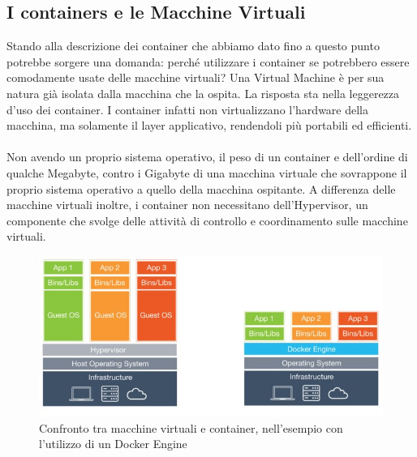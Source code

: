 \subsection{I containers e le Macchine Virtuali}
Stando alla descrizione dei container che abbiamo dato fino a questo punto potrebbe sorgere una domanda: perché utilizzare i container se potrebbero essere comodamente usate delle macchine virtuali? Una Virtual Machine è per sua natura già isolata dalla macchina che la ospita. La risposta sta nella leggerezza d'uso dei container. I container infatti non virtualizzano l'hardware della macchina, ma solamente il layer applicativo, rendendoli più portabili ed efficienti.

\paragraph{}
Non avendo un proprio sistema operativo, il peso di un container e dell'ordine di qualche Megabyte, contro i Gigabyte di una macchina virtuale che sovrappone il proprio sistema operativo a quello della macchina ospitante. A differenza delle macchine virtuali inoltre, i container non necessitano dell'Hypervisor, un componente che svolge delle attività di controllo e coordinamento sulle macchine virtuali. 

\begin{figure}[h!]
	\centering
	\includegraphics[width=\textwidth,keepaspectratio=true]{capitoli/imgs/ContainersvsVms.PNG}
	\caption{Confronto tra macchine virtuali e container, nell'esempio con l'utilizzo di un Docker Engine}
\end{figure}

